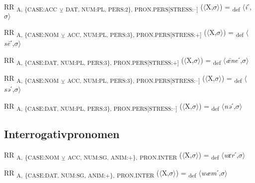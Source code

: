 {\begin{exe}
 RR \textsubscript{A, \{CASE:ACC} \textsubscript{${\veebar}$}\textsubscript{ DAT, NUM:PL, PERS:2\}, PRON.PERS[STRESS:–]} ($\langle$X,$\sigma $$\rangle$) = \textsubscript{def} $\langle$\textit{i}ˊ,$\sigma $$\rangle$
\end{exe}

\begin{exe}
 RR \textsubscript{A, \{CASE:NOM} \textsubscript{${\veebar}$}\textsubscript{ ACC, NUM:PL, PERS:3\}, PRON.PERS[STRESS:+]} ($\langle$X,$\sigma $$\rangle$) = \textsubscript{def} $\langle$\textit{s\=e}ˊ,$\sigma $$\rangle$
\end{exe}

\begin{exe}
 RR \textsubscript{A, \{CASE:DAT, NUM:PL, PERS:3\}, PRON.PERS[STRESS:+]} ($\langle$X,$\sigma $$\rangle$) = \textsubscript{def} $\langle$\textit{ǣne}ˊ,$\sigma $$\rangle$
\end{exe}

\begin{exe}
 RR \textsubscript{A, \{CASE:NOM} \textsubscript{${\veebar}$}\textsubscript{ ACC, NUM:PL, PERS:3\}, PRON.PERS[STRESS:–]} ($\langle$X,$\sigma $$\rangle$) = \textsubscript{def} $\langle$\textit{sə}ˊ,$\sigma $$\rangle$
\end{exe}

\begin{exe}
 RR \textsubscript{A, \{CASE:DAT, NUM:PL, PERS:3\}, PRON.PERS[STRESS:–]} ($\langle$X,$\sigma $$\rangle$) = \textsubscript{def} $\langle$\textit{nə}ˊ,$\sigma $$\rangle$
\end{exe}

\subsection{Interrogativpronomen}

\begin{exe}
 RR \textsubscript{A,} \textsubscript{\{CASE:NOM} \textsubscript{${\veebar}$}\textsubscript{ ACC, NUM:SG, ANIM:+\},} \textsubscript{PRON.INTER} ($\langle$X,$\sigma $$\rangle$) = \textsubscript{def} $\langle$\textit{wɛr}ˊ,$\sigma $$\rangle$
\end{exe}

\begin{exe}
 RR \textsubscript{A,} \textsubscript{\{CASE:DAT, NUM:SG, ANIM:+\},} \textsubscript{PRON.INTER} ($\langle$X,$\sigma $$\rangle$) = \textsubscript{def} $\langle$\textit{wæm}ˊ,$\sigma $$\rangle$
\end{exe}

}

